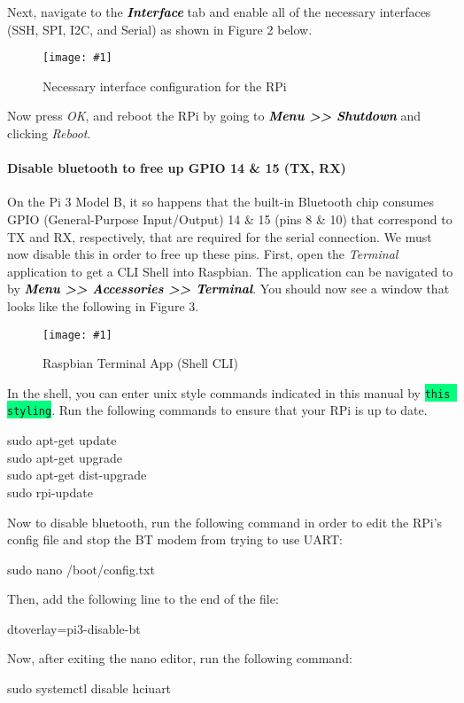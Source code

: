 \documentclass{article}
\newcommand*{\myfont}{\fontfamily{pcr}\selectfont}
\newcommand{\codei}[1]{\colorbox{SpringGreen}{\texttt{#1}}} %
\newcommand{\codeb}[2]{
  \begin{tcolorbox}[width=\textwidth,colback={SpringGreen},title={#1},colbacktitle=darkgreen,coltitle=SpringGreen]
    \myfont
    #2
  \end{tcolorbox}
} %
\newcommand{\outputb}[2]{
  \begin{tcolorbox}[width=\textwidth,colback={light-gray},title={#1},colbacktitle=gray,coltitle=light-gray]
    \myfont
    #2
  \end{tcolorbox}
} %
\newcommand{\loc}[1]{\textit{\textcolor{Black}{\textbf{#1}}}} %
\newcommand{\imagefig}[2]{
    \begin{figure}[H]
        \centering
        \texttt{[image: \#1]}
        \caption{#2}
    \end{figure}
}
\begin{document}
    Next, navigate to the \loc{Interface} tab and enable all of the necessary interfaces (SSH, SPI, I2C, and Serial) as shown in Figure 2 below.
    \imagefig{screen2.png}{Necessary interface configuration for the RPi}

    Now press \textit{OK}, and reboot the RPi by going to \loc{Menu >> Shutdown} and clicking \textit{Reboot}.

    \paragraph{Disable bluetooth to free up GPIO 14 \& 15 (TX, RX)}
    On the Pi 3 Model B, it so happens that the built-in Bluetooth chip consumes GPIO (General-Purpose Input/Output) 14 \& 15 (pins 8 \& 10) that correspond to TX and RX, respectively, that are required for the serial connection. We must now disable this in order to free up these pins. First, open the \textit{Terminal} application to get a CLI Shell into Raspbian. The application can be navigated to by \loc{Menu >> Accessories >> Terminal}. You should now see a window that looks like the following in Figure 3.
    \imagefig{screen3.png}{Raspbian Terminal App (Shell CLI)}

    In the shell, you can enter unix style commands indicated in this manual by \codei{this styling}. Run the following commands to ensure that your RPi is up to date.

    \codeb{Update environment}
    {
      sudo apt-get update \\
      sudo apt-get upgrade \\
      sudo apt-get dist-upgrade \\
      sudo rpi-update
    }

    Now to disable bluetooth, run the following command in order to edit the RPi's config file and stop the BT modem from trying to use UART:

    \codeb{Disable bluetooth: Edit boot config file}
    {
      sudo nano /boot/config.txt
    }

    Then, add the following line to the end of the file:

    \outputb{Disable bluetooth: Text to append to config file}
    {
      dtoverlay=pi3-disable-bt
    }

    Now, after exiting the nano editor, run the following command:

    \codeb{Disable bluetooth: Disable hciuart}
    {
      sudo systemctl disable hciuart
    }
\end{document}
